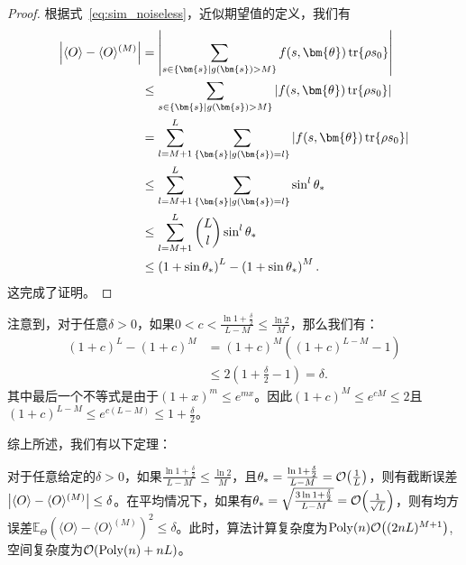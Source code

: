 \begin{proof}
    根据式~\eqref{eq:sim_noiseless}，近似期望值的定义，我们有
    \begin{equation}
        \begin{aligned}
            \abs{\langle O \rangle - \langle O \rangle ^{(M)}} &= \abs{\sum_{s\in\{\bm{s}\mid g(\bm{s})>M\}} f(s,\bm{\theta}) \tr{\rho s_0}} \\
            &\leq \sum_{s\in\{\bm{s}\mid g(\bm{s})>M\}} \abs{f(s,\bm{\theta}) \tr{\rho s_0}}\\
            &= \sum_{l=M+1}^{L} \sum_{\{\bm{s}\mid g(\bm{s})=l\}} \abs{f(s,\bm{\theta}) \tr{\rho s_0}}\\
            &\leq \sum_{l=M+1}^{L} \sum_{\{\bm{s}\mid g(\bm{s})=l\}} \sin^l{\theta_*} \\
            &\leq \sum_{l=M+1}^{L} \binom{L}{l} \sin^l{\theta_*}\\
            &\leq  \left(1+\sin{\theta_*}\right)^L - \left(1+\sin{\theta_*}\right)^M.
        \end{aligned}
    \end{equation}
    这完成了证明。
\end{proof}

注意到，对于任意$\delta>0$，如果$0<c<\frac{\ln{1+\frac{\delta}{2}}}{L-M}\leq \frac{\ln{2}}{M}$，那么我们有：
\begin{equation}
  \begin{aligned}
     \left(1+c\right)^{L}-\left(1+c\right)^{M}&= \left(1+c\right)^{M} \left(\left(1+c\right)^{L-M}-1 \right)\\
    &\leq 2\left(1+\frac{\delta}{2}-1\right)=\delta.
  \end{aligned}
\end{equation}
其中最后一个不等式是由于$(1+x)^m\leq e^{mx}$。因此$(1+c)^M\leq e^{cM}\leq 2$且$\left(1+c\right)^{L-M}\leq e^{c(L-M)}\leq 1+\frac{\delta}{2}$。

综上所述，我们有以下定理：
\begin{theorem}\label{thm:spd}
    对于任意给定的$\delta>0$，如果$\frac{\ln{1+\frac{\delta}{2}}}{L-M}\leq \frac{\ln{2}}{M}$，且$\theta_*=\frac{\ln{1+\frac{\delta}{2}}}{L-M}=\order{\frac{1}{L}}$，则有截断误差$\abs{\langle O \rangle - \langle O \rangle ^{(M)}}\leq \delta$。在平均情况下，如果有$\theta_*=\sqrt{\frac{3\ln{1+\frac{\delta}{2}}}{L-M}}=\order{\frac{1}{\sqrt{L}}}$，则有均方误差$\mathbb{E}_{\Theta}\left(\langle O \rangle - \langle O \rangle ^{(M)}\right)^2 \leq \delta$。此时，算法计算复杂度为$\mathrm{Poly}(n) \order{(2nL)^{M+1}}$, 空间复杂度为$\order{\mathrm{Poly}(n)+nL}$。
\end{theorem}


